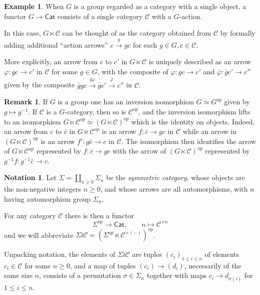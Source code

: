 \documentclass[a4paper,10pt
,draft
]{article}%
\numberwithin{equation}{section}
\numberwithin{figure}{section}
\theoremstyle{definition} %
\newtheorem{example}[equation]{Example}%
\newtheorem{remark}[equation]{Remark}%
\newtheorem{notation}[equation]{Notation}%
\newcommand{\longto}{\longrightarrow}%
\newcommand{\Cat}{\mathsf{Cat}}
\newcommand{\C}{\ensuremath{\mathcal C}}
\newcommand{\1}{\ensuremath{\mathbbm 1}}%
\begin{document}
\begin{example}\label{GLTIMES EQ}
When $G$ is a group regarded as a category with a single object,
a functor
$G \to \mathsf{Cat}$
consists of a single category $\C$ with a $G$-action.

In this case, $G \ltimes \mathcal{C}$
can be thought of as the category obtained from $\mathcal{C}$
by formally adding additional
``action arrows''
$c \xrightarrow{g} gc$ for each $g\in G,c\in \mathcal{C}$.

More explicitly, an arrow from $c$ to $c'$
in $G \ltimes \mathcal{C}$
is uniquely described as an arrow
$\varphi \colon gc \to c'$ in $\mathcal{C}$ for some $g \in G$,
with the composite of 
$\varphi \colon gc \to c'$
and
$\bar{\varphi} \colon \bar{g}c' \to c''$
given by
the composite
$ \bar{g}g c \xrightarrow{\bar{g} \varphi} \bar{g}c' \xrightarrow{\bar{\varphi}} c''$ in $\C$.
\end{example}




\begin{remark}\label{INVLTIMES REM}
	If $G$ is a group one has an inversion isomorphism
	$G \simeq G^{op}$ given by $g \mapsto g^{-1}$.
	If $\mathcal{C}$ is a $G$-category, 
	then so is $\mathcal{C}^{op}$,
	and the inversion isomorphism lifts
	to an isomorphism
	$G \ltimes \mathcal{C}^{op} \simeq \left(G \ltimes \mathcal{C}\right)^{op}$ which is the identity on objects.
	Indeed, an arrow from $c$ to $\bar{c}$
	in $G \ltimes \mathcal{C}^{op}$
	is an arrow $f \colon \bar{c} \to gc$ in $\mathcal{C}$
	while an arrow in $\left(G \ltimes \mathcal{C}\right)^{op}$
	is an arrow
	$f' \colon g \bar{c} \to c$ in $\mathcal{C}$.
	The isomorphism then identifies 
	the arrow of $G \ltimes \mathcal{C}^{op}$
	represented by
	$f \colon \bar{c} \to gc$ 
	with the arrow of $\left(G \ltimes \mathcal{C}\right)^{op}$
	represented by
	$g^{-1}f \colon g^{-1}\bar{c} \to c$.
\end{remark}




\begin{notation}\label{SIGWR NOT}
Let $\Sigma = \coprod_{n \geq 0} \Sigma_n$
be the \emph{symmetric category},
whose objects are the non-negative integers $n\geq 0$,
and whose arrows are all automorphisms,
with $n$ having automorphism group $\Sigma_n$.
 
For any category $\mathcal{C}$ there is then a functor
\begin{equation}
	\Sigma^{op} \longto \Cat,
	\qquad
	n \mapsto \mathcal C^{\times n}
\end{equation}
and we will abbreviate
$\Sigma \wr \C = 
\left(\Sigma^{op} \ltimes \mathcal C^{\times (-)}\right)^{op}$.

Unpacking notation, 
the elements of $\Sigma \wr \mathcal{C}$
are tuples
$(c_i)_{1 \leq i \leq n}$
of elements $c_i \in \mathcal{C}$ for some $n \geq 0$,
and a map of tuples $(c_i) \to (d_i)$, 
necessarily of the same size $n$,
consists of a permutation 
$\sigma \in \Sigma_n$
together with maps
$c_i \to d_{\sigma(i)}$
for $1 \leq i \leq n$.
\end{notation}
\end{document}
